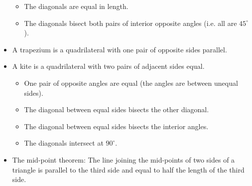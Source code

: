\begin{itemize}
\begin{itemize}
  \item The diagonals are equal in length.
  \item The diagonals bisect both pairs of interior opposite angles
    (i.e.\@{} all are $45^\circ$).
  \end{itemize}
\item A trapezium is a quadrilateral with one pair of opposite sides parallel.
\item A kite is a quadrilateral with two pairs of adjacent sides equal.
  \begin{itemize}
  \item One pair of opposite angles are equal (the angles are between unequal sides).
  \item The diagonal between equal sides bisects the other diagonal.
  \item The diagonal between equal sides bisects the interior angles.
  \item The diagonals intersect at $90^\circ$.
  \end{itemize}
\item The mid-point theorem: The line joining the mid-points of two
  sides of a triangle is parallel to the third side and equal to half
  the length of the third side.
\end{itemize}

